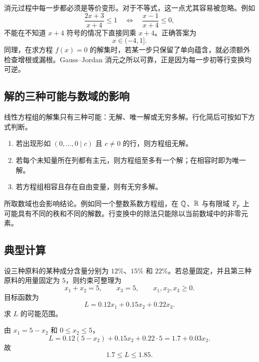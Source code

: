 \begin{remark}
消元过程中每一步都必须是等价变形。对于不等式，这一点尤其容易被忽略。例如
\begin{equation}
 \frac{2x+3}{x+4}\leq 1
 \quad\Longleftrightarrow\quad
 \frac{x-1}{x+4}\leq 0,
\end{equation}
不能在不知道 $x+4$ 符号的情况下直接同乘 $x+4$。正确答案为
\begin{equation}
 x\in(-4,1].
\end{equation}
同理，在求方程 $f(x)=0$ 的解集时，若某一步只保留了单向蕴含，就必须额外检查增根或漏根。Gauss--Jordan 消元之所以可靠，正是因为每一步初等行变换均可逆。
\end{remark}

\subsection{解的三种可能与数域的影响}

线性方程组的解集只有三种可能：无解、唯一解或无穷多解。行化简后可按如下方式判断。
\begin{enumerate}
  \item 若出现形如 $(0,\ldots,0\mid c)$ 且 $c\neq0$ 的行，则方程组无解。
  \item 若每个未知量所在列都有主元，则方程组至多有一个解；在相容时即为唯一解。
  \item 若方程组相容且存在自由变量，则有无穷多解。
\end{enumerate}

所取数域也会影响结论。例如同一个整数系数方程组，在 $\mathbb Q$、$\mathbb R$ 与有限域 $\mathbb F_p$ 上可能具有不同的秩和不同的解数。行变换中的除法只能除以当前数域中的非零元素。

\subsection{典型计算}

\begin{exercise}[线性规划的一个简单例子]
设三种原料的某种成分含量分别为 $12\%$、$15\%$ 和 $22\%$。若总量固定，并且第三种原料的用量固定为 $5$，则约束可整理为
\begin{equation}
 x_1+x_2=5,
 \qquad x_3=5,
 \qquad x_1,x_2,x_3\geq0.
\end{equation}
目标函数为
\begin{equation}
 L=0.12x_1+0.15x_2+0.22x_3.
\end{equation}
求 $L$ 的可能范围。
\end{exercise}

\begin{solution}
由 $x_1=5-x_2$ 和 $0\leq x_2\leq5$，
\begin{equation}
 L=0.12(5-x_2)+0.15x_2+0.22\cdot5
   =1.7+0.03x_2.
\end{equation}
故
\begin{equation}
 1.7\leq L\leq1.85.
\end{equation}
\end{solution}

